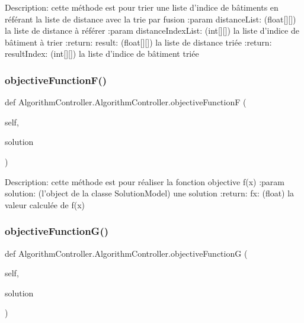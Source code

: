 \begin{DoxyVerb}Description: cette méthode est pour trier une liste d'indice de bâtiments en référant la liste de distance
        avec la trie par fusion
:param distanceList: (float[][]) la liste de distance à référer
:param distanceIndexList: (int[][]) la liste d'indice de bâtiment à trier
:return: result: (float[][]) la liste de distance triée
:return: resultIndex: (int[][]) la liste d'indice de bâtiment triée
\end{DoxyVerb}
 \mbox{\label{class_algorithm_controller_1_1_algorithm_controller_a93b60c2a1787e8d5c3f940ddd6d051e9}} 
\subsubsection{\texorpdfstring{objective\+Function\+F()}{objectiveFunctionF()}}
{\footnotesize\ttfamily def Algorithm\+Controller.\+Algorithm\+Controller.\+objective\+FunctionF (\begin{DoxyParamCaption}\item[{}]{self,  }\item[{}]{solution }\end{DoxyParamCaption})}

\begin{DoxyVerb}Description: cette méthode est pour réaliser la fonction objective f(x)
:param solution: (l'object de la classe SolutionModel) une solution
:return: fx: (float) la valeur calculée de f(x)
\end{DoxyVerb}
 \mbox{\label{class_algorithm_controller_1_1_algorithm_controller_a96414bd12515fbd19bc103cbc0b9cdcb}} 
\subsubsection{\texorpdfstring{objective\+Function\+G()}{objectiveFunctionG()}}
{\footnotesize\ttfamily def Algorithm\+Controller.\+Algorithm\+Controller.\+objective\+FunctionG (\begin{DoxyParamCaption}\item[{}]{self,  }\item[{}]{solution }\end{DoxyParamCaption})}

